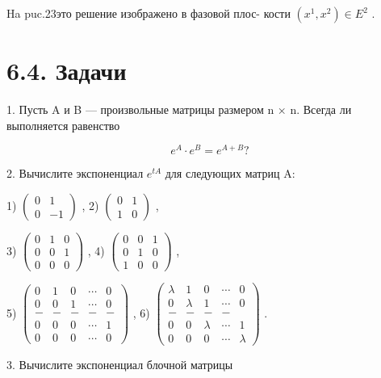 \documentclass[8pt]{extarticle}
\begin{document}
Ha puc.23это решение изображено в фазовой плос- кости \(\left( {{x}^{1},{x}^{2}}\right)  \in  {E}^{2}\) .

\section*{6.4. Задачи}

1. Пусть A и B — произвольные матрицы размером n × n. Всегда ли выполняется равенство

\[
{e}^{A} \cdot  {e}^{B} = {e}^{A + B}?
\]

2. Вычислите экспоненциал \({e}^{tA}\) для следующих матриц A:

1) \(\left( \begin{array}{cc} 0 & 1 \\  0 &  - 1 \end{array}\right)\) , 2) \(\left( \begin{array}{ll} 0 & 1 \\  1 & 0 \end{array}\right)\) ,

3) \(\left( \begin{array}{lll} 0 & 1 & 0 \\  0 & 0 & 1 \\  0 & 0 & 0 \end{array}\right)\) , 4) \(\left( \begin{array}{lll} 0 & 0 & 1 \\  0 & 1 & 0 \\  1 & 0 & 0 \end{array}\right)\) ,

5) \(\left( \begin{array}{ccccc} 0 & 1 & 0 & \cdots & 0 \\  0 & 0 & 1 & \cdots & 0 \\   - &  - &  - &  - &  - \\  0 & 0 & 0 & \cdots & 1 \\  0 & 0 & 0 & \cdots & 0 \end{array}\right)\) , 6) \(\left( \begin{array}{ccccc} \lambda & 1 & 0 & \cdots & 0 \\  0 & \lambda & 1 & \cdots & 0 \\   - &  - &  - &  - & \\  0 & 0 & \lambda & \cdots & 1 \\  0 & 0 & 0 & \cdots & \lambda \end{array}\right)\) .

3. Вычислите экспоненциал блочной матрицы
\end{document}
